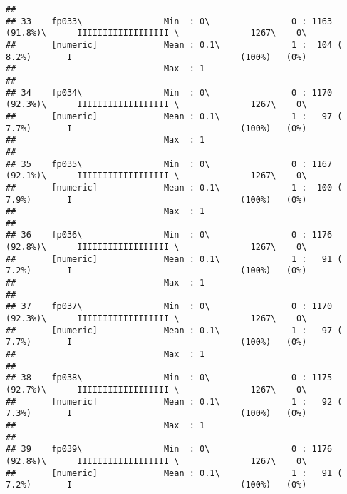\documentclass[]{article}
\begin{document}
\begin{verbatim}
## 
## 33    fp033\                Min  : 0\                0 : 1163 (91.8%)\      IIIIIIIIIIIIIIIIII \              1267\    0\       
##       [numeric]             Mean : 0.1\              1 :  104 ( 8.2%)       I                                 (100%)   (0%)     
##                             Max  : 1                                                                                            
## 
## 34    fp034\                Min  : 0\                0 : 1170 (92.3%)\      IIIIIIIIIIIIIIIIII \              1267\    0\       
##       [numeric]             Mean : 0.1\              1 :   97 ( 7.7%)       I                                 (100%)   (0%)     
##                             Max  : 1                                                                                            
## 
## 35    fp035\                Min  : 0\                0 : 1167 (92.1%)\      IIIIIIIIIIIIIIIIII \              1267\    0\       
##       [numeric]             Mean : 0.1\              1 :  100 ( 7.9%)       I                                 (100%)   (0%)     
##                             Max  : 1                                                                                            
## 
## 36    fp036\                Min  : 0\                0 : 1176 (92.8%)\      IIIIIIIIIIIIIIIIII \              1267\    0\       
##       [numeric]             Mean : 0.1\              1 :   91 ( 7.2%)       I                                 (100%)   (0%)     
##                             Max  : 1                                                                                            
## 
## 37    fp037\                Min  : 0\                0 : 1170 (92.3%)\      IIIIIIIIIIIIIIIIII \              1267\    0\       
##       [numeric]             Mean : 0.1\              1 :   97 ( 7.7%)       I                                 (100%)   (0%)     
##                             Max  : 1                                                                                            
## 
## 38    fp038\                Min  : 0\                0 : 1175 (92.7%)\      IIIIIIIIIIIIIIIIII \              1267\    0\       
##       [numeric]             Mean : 0.1\              1 :   92 ( 7.3%)       I                                 (100%)   (0%)     
##                             Max  : 1                                                                                            
## 
## 39    fp039\                Min  : 0\                0 : 1176 (92.8%)\      IIIIIIIIIIIIIIIIII \              1267\    0\       
##       [numeric]             Mean : 0.1\              1 :   91 ( 7.2%)       I                                 (100%)   (0%)     

\end{verbatim}
\end{document}
